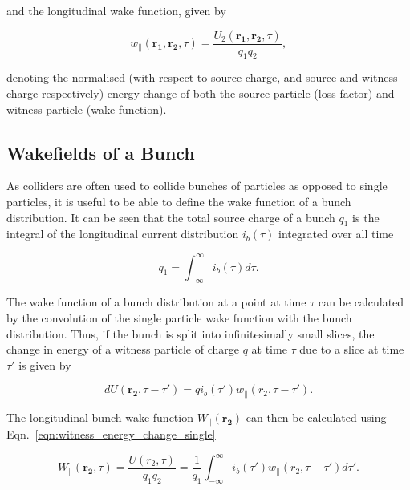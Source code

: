 and the longitudinal wake function, given by

\begin{equation}
w_{\parallel}\left(\mathbf{r_{1}}, \mathbf{r_{2}}, \tau   \right) = \frac{U_{2}\left(\mathbf{r_{1}}, \mathbf{r_{2}}, \tau  \right) }{q_{1} q_{2}},
\label{eqn:long_wake_func}
\end{equation}

denoting the normalised (with respect to source charge, and source and witness charge respectively) energy change of both the source particle (loss factor) and witness particle (wake function). 

\subsection{Wakefields of a Bunch}

As colliders are often used to collide bunches of particles as opposed to single particles, it is useful to be able to define the wake function of a bunch distribution. It can be seen that the total source charge of a bunch $q_{1}$ is the integral of the longitudinal current distribution $i_{b}\left( \tau \right)$ integrated over all time

\begin{equation}
q_{1} = \int^{\infty}_{-\infty}i_{b}\left( \tau \right) d\tau{}.
\end{equation}

The wake function of a bunch distribution at a point at time $\tau$ can be calculated by the convolution of the single particle wake function with the bunch distribution. Thus, if the bunch is split into infinitesimally small slices, the change in energy of a witness particle of charge $q$ at time $\tau$ due to a slice at time $\tau{}'$ is given by

\begin{equation}
dU\left(\mathbf{r_{2}}, \tau-\tau{}'  \right) = q i_{b}\left( \tau{}' \right) w_{\parallel}\left( r_{2}, \tau{}-\tau{}' \right).
\end{equation}

The longitudinal bunch wake function $W_{\parallel}\left(\mathbf{r_{2}}\right)$ can then be calculated using Eqn.~\ref{eqn:witness_energy_change_single}

\begin{equation}
W_{\parallel}\left( \mathbf{r_{2}}, \tau \right) = \frac{U\left( r_{2}, \tau \right) }{q_{1} q_{2}} = \frac{1}{q_{1}}\int^{\infty}_{-\infty}i_{b}\left( \tau{}' \right) w_{\parallel}\left( r_{2}, \tau{}-\tau{}'\right) d\tau{}' .
\end{equation}

